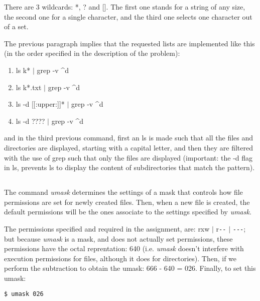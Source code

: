 \documentclass[paper=a4, fontsize=11pt]{scrartcl} %
\numberwithin{equation}{section} %
\numberwithin{figure}{section} %
\numberwithin{table}{section} %
\begin{document}
\begin{onehalfspacing}
There are 3 wildcards: *, ? and []. The first one stands for a string of any size, the second one for a single character, and the third one selects one character out of a set.

The previous paragraph implies that the requested lists are implemented like this (in the order specified in the description of the problem):

\begin{enumerate}
\item ls k* $|$ grep -v \textasciicircum d
\item ls k*.txt $|$ grep -v \textasciicircum d
\item ls -d [[:upper:]]* $|$ grep -v \textasciicircum d
\item ls -d ???? $|$ grep -v \textasciicircum d
\end{enumerate}

and in the third previous command, first an ls is made such that all the files and directories are displayed, starting with a capital letter, and then they are filtered with the use of grep such that only the files are displayed (important: the -d flag in ls, prevents ls to display the content of subdirectories that match the pattern).


\subsection{\textbf{}}

The command \textit{umask} determines the settings of a mask that controls how file permissions are set for newly created files. Then, when a new file is created, the default permissions will be the ones associate to the settings specified by \textit{umask}.

The permissions specified and required in the assignment, are: rxw $|$ r\texttt{-}\texttt{-} $|$ \texttt{-}\texttt{-}\texttt{-}; but because \textit{umask} is a mask, and does not actually set permissions, these permissions have the octal reprentation: 640 (i.e. \textit{umask} doesn't interfere with execution permissions for files, although it does for directories). Then, if we perform the subtraction to obtain the umask: 666 - 640 = 026. Finally, to set this umask:

\begin{lstlisting}[language=bash]
  $ umask 026
\end{lstlisting}

\subsection{\textbf{}}


\end{onehalfspacing}
\end{document}
